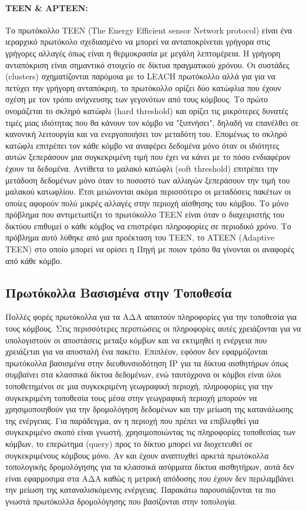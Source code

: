 \paragraph{TEEN \& APTEEN:} Το πρωτόκολλο TEEN (The Energy Efficient sensor Network protocol) \cite{teen_protocol} είναι ένα
ιεραρχικό πρωτόκολο σχεδιασμένο να μπορεί να ανταποκρίνεται γρήγορα στις γρήγορες αλλαγές όπως είναι η θερμοκρασία με μεγάλη λεπτομέρεια. Η γρήγορη ανταπόκριση είναι
σημαντικό στοιχείο σε δίκτυα πραγματικού χρόνου. Οι συστάδες (clusters) σχηματίζονται παρόμοια με το LEACH πρωτόκολλο αλλά για για να πετύχει την γρήγορη ανταπόκριη,
το πρωτόκολλο ορίζει δύο κατώφλια που έχουν σχέση με τον τρόπο ανίχνευσης των γεγονότων από τους κόμβους. Το πρώτο ονομάζεται το σκληρό κατώφλι (hard threshold) και
ορίζει τις μικρότερες δυνατές τιμές μιας ιδιότητας που θα κάνουν τον κόμβο να "ξυπνήσει", δηλαδή να επανέλθει σε κανονική λειτουργία και να ενεργοποιήσει τον μεταδότη
του. Επομένως το σκληρό κατώφλι επιτρέπει τον κάθε κόμβο να αναφέρει δεδομένα μόνο όταν οι ιδιότητες αυτών ξεπεράσουν μια συγκεκριμένη τιμή που έχει να κάνει με το
πόσο ενδιαφέρον έχουν τα δεδομένα. Αντίθετα το μαλακό κατώφλι (soft threshold) επιτρέπει την μετάδοση δεδομένων μόνο όταν το ποσοστό των αλλαγών ξεπεράσουν την τιμή
του μαλακού κατωφλίου. Έτσι μειώνονται ακόμα περισσότερο οι μεταδόσεις πακέτων οι οποίες αφορούν πολύ μικρές αλλαγές στην περιοχή αίσθησης του κόμβου. Το μόνο
πρόβλημα που αντιμετωπίζει το πρωτόκολλο TEEN είναι όταν ο διαχειριστής του δικτύου επιθυμεί ο κάθε κόμβος να επιστρέφει πληροφορίες σε περιοδικό χρόνο. Το πρόβλημα
αυτό λύθηκε από μια προέκταση του TEEN, το ATEEN (Adaptive TEEN) \cite{apteen_protocol} στο οποίο μπορεί να ορίσει η Πηγή με ποιον τρόπο θα γίνονται οι αναφορές από
κάθε κόμβο.


\subsection{Πρωτόκολλα Βασισμένα στην Τοποθεσία}
Πολλές φορές πρωτόκολλα για τα ΑΔΑ απαιτούν πληροφορίες για την τοποθεσία για τους κόμβους.
Στις περισσότερες περιπτώσεις οι πληροφορίες αυτές χρειάζονται για να υπολογιστούν οι αποστάσεις μεταξυ κόμβων και να εκτιμηθεί η ενέργεια που χρειάζεται για να
αποσταλή ένα πακέτο.
Επιπλέον, εφόσον δεν εφαρμόζονται πρωτόκολλα βασισμένα στην διευθυνσιοδότηση IP για τα δίκτυα αισθητήρων όπως συμβαίνει στα κλασσικά δίκτυα δεδομένων, ενώ ταυτόχρονα
οι κόμβοι είναι όλοι τοποθετημένοι σε μια συγκεκριμένη γεωγραφική περιοχή, πληροφορίες για την συγκεκριμένη τοποθεσία τους μέσα στην γεωγραφική περιοχή μπορούν
να χρησιμοποιηθούν για την δρομολόγηση δεδομένων και την μείωση της κατανάλωσης της ενέργειας.
Για παράδειγμα, αν η περιοχή που πρέπει να επιβλεφθεί για συγκεκριμένο σκοπό είναι γνωστή, χρησιμοποιώντας τις πληροφορίες τοποθεσίας των κόμβων, το επερώτημα (query)
προς το δίκτυο μπορεί να διοχετευθεί σε συγκεκριμένους κόμβους μόνο.
Αν και έχουν αναπτυχθεί αρκετά πρωτόκολλα τοπολογικής δρομολόγησης για τα κλασσικά ασύρματα δίκτυα αισθητήρων, αυτά δεν είναι εφαρμοσιμα στα ΑΔΑ καθώς η μετρική
απόδοσης που έχουν δεν περιλαμβάνει την μείωση της καταναλισκόμενης ενέργειας. Παρακάτω παρουσιάζονται τα πιο γνωστά πρωτόκολλα δρομολόγησης που βασίζονται στην
τοπολογία.


